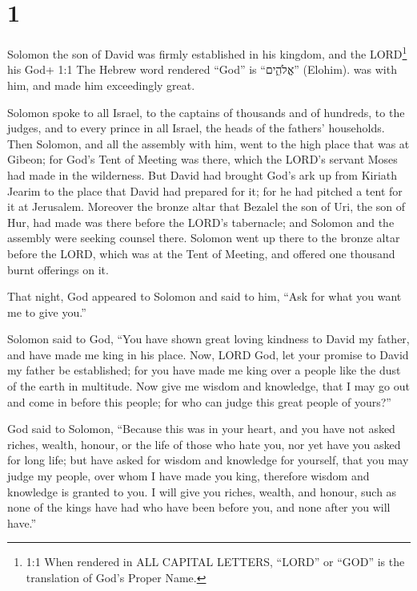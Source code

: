 \hypertarget{section}{%
\section{1}\label{section}}

 Solomon the son of David was firmly established in his
kingdom, and the LORD\footnote{1:1 When rendered in ALL CAPITAL LETTERS,
  ``LORD'' or ``GOD'' is the translation of God's Proper Name.} his God+
1:1 The Hebrew word rendered ``God'' is ``אֱלֹהִ֑ים'' (Elohim). was with
him, and made him exceedingly great.

 Solomon spoke to all Israel, to the captains of thousands
and of hundreds, to the judges, and to every prince in all Israel, the
heads of the fathers' households.  Then Solomon, and all the
assembly with him, went to the high place that was at Gibeon; for God's
Tent of Meeting was there, which the LORD's servant Moses had made in
the wilderness.  But David had brought God's ark up from
Kiriath Jearim to the place that David had prepared for it; for he had
pitched a tent for it at Jerusalem.  Moreover the bronze
altar that Bezalel the son of Uri, the son of Hur, had made was there
before the LORD's tabernacle; and Solomon and the assembly were seeking
counsel there.  Solomon went up there to the bronze altar
before the LORD, which was at the Tent of Meeting, and offered one
thousand burnt offerings on it.

 That night, God appeared to Solomon and said to him, ``Ask
for what you want me to give you.''

 Solomon said to God, ``You have shown great loving kindness
to David my father, and have made me king in his place. 
Now, LORD God, let your promise to David my father be established; for
you have made me king over a people like the dust of the earth in
multitude.  Now give me wisdom and knowledge, that I may go
out and come in before this people; for who can judge this great people
of yours?''

 God said to Solomon, ``Because this was in your heart, and
you have not asked riches, wealth, honour, or the life of those who hate
you, nor yet have you asked for long life; but have asked for wisdom and
knowledge for yourself, that you may judge my people, over whom I have
made you king,  therefore wisdom and knowledge is granted
to you. I will give you riches, wealth, and honour, such as none of the
kings have had who have been before you, and none after you will have.''

